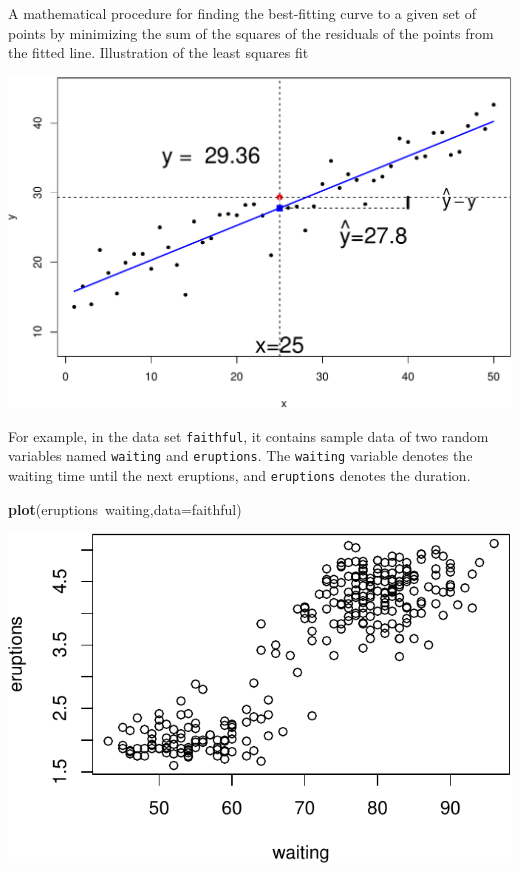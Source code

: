 \documentclass[]{article}
\newenvironment{Shaded}{\begin{snugshade}}{\end{snugshade}}
\newcommand{\KeywordTok}[1]{\textcolor[rgb]{0.13,0.29,0.53}{\textbf{{#1}}}}
\newcommand{\DataTypeTok}[1]{\textcolor[rgb]{0.13,0.29,0.53}{{#1}}}
\newcommand{\NormalTok}[1]{{#1}}
\numberwithin{equation}{section}
\begin{document}
A mathematical procedure for finding the best-fitting curve to a given
set of points by minimizing the sum of the squares of the residuals of
the points from the fitted line. Illustration of the least squares fit

\includegraphics{index_files/figure-latex/unnamed-chunk-179-1.pdf}

For example, in the data set \texttt{faithful}, it contains sample data
of two random variables named \texttt{waiting} and \texttt{eruptions}.
The \texttt{waiting} variable denotes the waiting time until the next
eruptions, and \texttt{eruptions} denotes the duration.

\begin{Shaded}
\begin{Highlighting}[]
\KeywordTok{plot}\NormalTok{(eruptions~waiting,}\DataTypeTok{data=}\NormalTok{faithful)}
\end{Highlighting}
\end{Shaded}

\includegraphics{index_files/figure-latex/unnamed-chunk-180-1.pdf}
\end{document}
